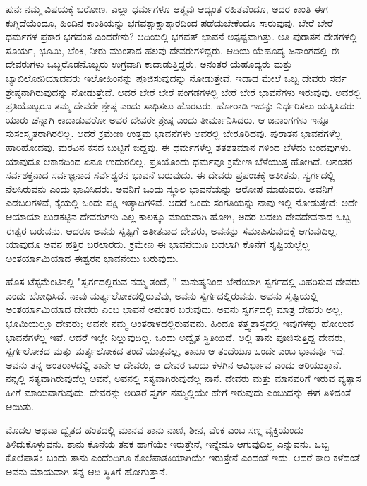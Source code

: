 ಪುನಃ ನಮ್ಮ ವಿಷಯಕ್ಕೆ ಬರೋಣ. ಎಲ್ಲಾ ಧರ್ಮಗಳೂ ಆತ್ಮವು ಆದ್ಯಂತ ರಹಿತವೆಂದೂ, ಅದರ ಕಾಂತಿ ಈಗ ಕುಗ್ಗಿದೆಯೆಂದೂ, ಹಿಂದಿನ ಕಾಂತಿಯನ್ನು ಭಗವತ್ಸಾಕ್ಷಾತ್ಕಾರದಿಂದ ಪಡೆಯಬೇಕೆಂದೂ ಸಾರುವುವು. ಬೇರೆ ಬೇರೆ ಧರ್ಮಗಳ ಪ್ರಕಾರ ಭಗವಂತ ಎಂದರೇನು? ಆದಿಯಲ್ಲಿ ಭಗವತ್ ಭಾವನೆ ಅಸ್ಪಷ್ಟವಾಗಿತ್ತು. ಅತಿ ಪುರಾತನ ದೇಶಗಳಲ್ಲಿ ಸೂರ್ಯ, ಭೂಮಿ, ಬೆಂಕಿ, ನೀರು ಮುಂತಾದ ಹಲವು ದೇವರುಗಳಿದ್ದರು. ಆದಿಯ ಯೆಹೂದ್ಯ ಜನಾಂಗದಲ್ಲಿ ಈ ದೇವರುಗಳು ಒಬ್ಬರೊಡನೊಬ್ಬರು ಉಗ್ರವಾಗಿ ಕಾದಾಡುತ್ತಿದ್ದರು. ಅನಂತರ ಯೆಹೂದ್ಯರು ಮತ್ತು ಬ್ಯಾಬಿಲೋನಿಯಾದವರು ಇಲೋಹಿಂನನ್ನು ಪೂಜಿಸುವುದನ್ನು ನೋಡುತ್ತೇವೆ. ಇದಾದ ಮೇಲೆ ಒಬ್ಬ ದೇವರು ಸರ್ವ ಶ್ರೇಷ್ಠನಾಗಿರುವುದನ್ನು ನೋಡುತ್ತೇವೆ. ಆದರೆ ಬೇರೆ ಬೇರೆ ಪಂಗಡಗಳಲ್ಲಿ ಬೇರೆ ಬೇರೆ ಭಾವನೆಗಳು ಇರುವುವು. ಅವರಲ್ಲಿ ಪ್ರತಿಯೊಬ್ಬರೂ ತಮ್ಮ ದೇವರೇ ಶ್ರೇಷ್ಠ ಎಂದು ಸಾಧಿಸಲು ಹೊರಟರು. ಹೋರಾಡಿ ಇದನ್ನು ನಿರ್ಧರಿಸಲು ಯತ್ನಿಸಿದರು. ಯಾರು ಚೆನ್ನಾಗಿ ಕಾದಾಡುವರೋ ಅವರ ದೇವರೇ ಶ್ರೇಷ್ಠ ಎಂದು ತೀರ್ಮಾನಿಸಿದರು. ಆ ಜನಾಂಗಗಳು ಇನ್ನೂ ಸುಸಂಸ್ಕೃತರಾಗಿರಲಿಲ್ಲ. ಆದರೆ ಕ್ರಮೇಣ ಉತ್ತಮ ಭಾವನೆಗಳು ಅವರಲ್ಲಿ ಬೇರೂರಿದವು. ಪುರಾತನ ಭಾವನೆಗಳೆಲ್ಲ ಹಾರಿಹೋದವು, ಮರವಿನ ಕಸದ ಬುಟ್ಟಿಗೆ ಬಿದ್ದವು. ಈ ಧರ್ಮಗಳೆಲ್ಲ ಶತಶತಮಾನ ಗಳಿಂದ ಬೆಳೆದು ಬಂದವುಗಳು. ಯಾವುದೂ ಆಕಾಶದಿಂದ ಏನೂ ಉದುರಲಿಲ್ಲ. ಪ್ರತಿಯೊಂದು ಧರ್ಮವೂ ಕ್ರಮೇಣ ಬೆಳೆಯುತ್ತ ಹೋಗಿದೆ. ಅನಂತರ ಸರ್ವಶಕ್ತನಾದ ಸರ್ವಜ್ಞನಾದ ಸರ್ವೆಶ್ವರನ ಭಾವನೆ ಬರುವುದು. ಈ ದೇವರು ಪ್ರಪಂಚಕ್ಕೆ ಅತೀತನು, ಸ್ವರ್ಗದಲ್ಲಿ ನೆಲಸಿರುವನು ಎಂದು ಭಾವಿಸಿದರು. ಅವನಿಗೆ ಒಂದು ಸ್ಥೂಲ ಭಾವನೆಯನ್ನು ಆರೋಪ ಮಾಡುವರು. ಅವನಿಗೆ ಎಡಬಲಗಳಿವೆ, ಕೈಯಲ್ಲಿ ಒಂದು ಪಕ್ಷಿ ಇತ್ಯಾದಿಗಳಿವೆ. ಆದರೆ ಒಂದು ಸಂಗತಿಯನ್ನು ನಾವು ಇಲ್ಲಿ ನೋಡುತ್ತೇವೆ: ಅದೇ ಆಯಾಯಾ ಬುಡಕಟ್ಟಿನ ದೇವರುಗಳು ಎಲ್ಲ ಕಾಲಕ್ಕೂ ಮಾಯವಾಗಿ ಹೋಗಿ, ಅದರ ಬದಲು ದೇವದೇವನಾದ ಒಬ್ಬ ಈಶ್ವರ ಬರುವನು. ಆದರೂ ಅವನು ಸೃಷ್ಟಿಗೆ ಅತೀತನಾದ ದೇವರು, ಅವನನ್ನು ಸಮಾಪಿಸುವುದಕ್ಕೆ ಆಗುವುದಿಲ್ಲ. ಯಾವುದೂ ಅವನ ಹತ್ತಿರ ಬರಲಾರದು. ಕ್ರಮೇಣ ಈ ಭಾವನೆಯೂ ಬದಲಾಗಿ ಕೊನೆಗೆ ಸೃಷ್ಟಿಯಲ್ಲೆಲ್ಲ ಅಂತರ್ಯಾಮಿಯಾದ ಈಶ್ವರನ ಭಾವನೆಯು ಬರುವುದು.

ಹೊಸ ಟೆಸ್ಟಮೆಂಟಿನಲ್ಲಿ "ಸ್ವರ್ಗದಲ್ಲಿರುವ ನಮ್ಮ ತಂದೆ, '' ಮನುಷ್ಯನಿಂದ ಬೇರೆಯಾಗಿ ಸ್ವರ್ಗದಲ್ಲಿ ವಿಹರಿಸುವ ದೇವರು ಎಂದು ಬೋಧಿಸಿದೆ. ನಾವು ಮರ್ತ್ಯಲೋಕದಲ್ಲಿರುವೆವು, ಅವನು ಸ್ವರ್ಗದಲ್ಲಿರುವನು. ಅವನು ಸೃಷ್ಟಿಯಲ್ಲಿ ಅಂತರ್ಯಾಮಿಯಾದ ದೇವರು ಎಂಬ ಭಾವನೆ ಅನಂತರ ಬರುವುದು. ಅವನು ಸ್ವರ್ಗದಲ್ಲಿ ಮಾತ್ರ ದೇವರು ಅಲ್ಲ, ಭೂಮಿಯಲ್ಲೂ ದೇವರು; ಅವನೇ ನಮ್ಮ ಅಂತರಾಳದಲ್ಲಿರುವವನು. ಹಿಂದೂ ತತ್ತ್ವಶಾಸ್ತ್ರದಲ್ಲಿ ಇವುಗಳನ್ನು ಹೋಲುವ ಭಾವನೆಗಳೆಲ್ಲ ಇವೆ. ಆದರೆ ಇಲ್ಲೇ ನಿಲ್ಲುವುದಿಲ್ಲ. ಒಂದು ಅದ್ವೈತ ಸ್ಥಿತಿಯಿದೆ, ಅಲ್ಲಿ ತಾನು ಪೂಜಿಸುತ್ತಿದ್ದ ದೇವರು, ಸ್ವರ್ಗಲೋಕದ ಮತ್ತು ಮರ್ತ್ಯಲೋಕದ ತಂದೆ ಮಾತ್ರವಲ್ಲ, ತಾನೂ ಆ ತಂದೆಯೂ ಒಂದೇ ಎಂಬ ಭಾವವೂ ಇದೆ. ಅವನು ತನ್ನ ಅಂತರಾಳದಲ್ಲಿ ತಾನೇ ಆ ದೇವರು, ಆ ದೇವರ ಒಂದು ಕೆಳಗಿನ ಆವಿರ್ಭಾವ ಎಂದು ಅರಿಯುತ್ತಾನೆ. ನನ್ನಲ್ಲಿ ಸತ್ಯವಾಗಿರುವುದೆಲ್ಲ ಅವನೆ, ಅವನಲ್ಲಿ ಸತ್ಯವಾಗಿರುವುದೆಲ್ಲ ನಾನೆ. ದೇವರು ಮತ್ತು ಮಾನವರಿಗೆ ಇರುವ ವ್ಯತ್ಯಾಸ ಹೀಗೆ ಮಾಯವಾಗುವುದು. ದೇವರನ್ನು ಅರಿತರೆ ಸ್ವರ್ಗ ನಮ್ಮಲ್ಲಿಯೇ ಹೇಗೆ ಇರುವುದು ಎಂಬುದನ್ನು ಈಗ ತಿಳಿದಂತೆ ಆಯಿತು.

ಮೊದಲ ಅಥವಾ ದ್ವೈತದ ಹಂತದಲ್ಲಿ ಮಾನವ ತಾನು ನಾಣಿ, ಶೀನ, ವೆಂಕ ಎಂಬ ಸಣ್ಣ ವ್ಯಕ್ತಿಯೆಂದು ತಿಳಿದುಕೊಳ್ಳುವನು. ತಾನು ಕೊನೆಯ ತನಕ ಹಾಗೆಯೇ ಇರುತ್ತೇನೆ, ಇನ್ನೇನೂ ಆಗುವುದಿಲ್ಲ ಎನ್ನುವನು. ಒಬ್ಬ ಕೊಲೆಪಾತಕಿ ಬಂದು ತಾನು ಎಂದೆಂದಿಗೂ ಕೊಲೆಪಾತಕಿಯಾಗಿಯೇ ಇರುತ್ತೇನೆ ಎಂದಂತೆ ಇದು. ಆದರೆ ಕಾಲ ಕಳೆದಂತೆ ಅವನು ಮಾಯವಾಗಿ ತನ್ನ ಆದಿ ಸ್ಥಿತಿಗೆ ಹೋಗುತ್ತಾನೆ.


